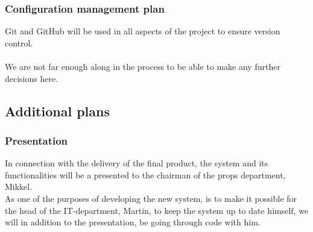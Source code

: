 \documentclass[12pt]{article}
\begin{document}
\subsubsection{Configuration management plan}
Git and GitHub will be used in all aspects of the project to ensure version control.\\\\
We are not far enough along in the process to be able to make any further decisions here.
\subsection{Additional plans}
\subsubsection{Presentation}
In connection with the delivery of the final product, the system and its functionalities will be a presented to the chairman of the props department, Mikkel. \\
As one of the purposes of developing the new system, is to make it possible for the head of the IT-department, Martin, to keep the system up to date himself, we will in addition to the presentation, be going through code with him.
\end{document}
